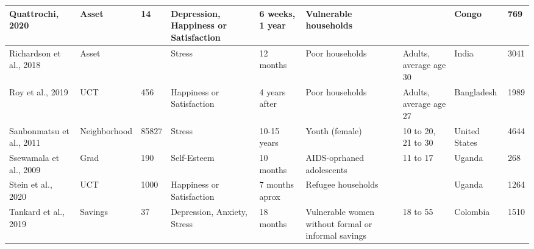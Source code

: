 \begin{table}[ht]
\begin{tabular}{p{1.8cm}p{1.7cm}p{1.3 cm}p{2cm}p{1.7cm}p{2.0cm}p{1cm}p{1.2cm}p{1cm}}
   \hline
Quattrochi, 2020 & Asset & 14 & Depression, Happiness or Satisfaction & 6 weeks, 1 year & Vulnerable households &  & Congo & 769 \\ 
   \hline
Richardson et al., 2018 & Asset &  & Stress & 12 months & Poor households & Adults, average age 30 & India & 3041 \\ 
   \hline
Roy et al., 2019 & UCT & 456 & Happiness or Satisfaction & 4 years after & Poor households & Adults, average age 27 & Bangladesh & 1989 \\ 
   \hline
Sanbonmatsu et al., 2011 & Neighborhood & 85827 & Stress & 10-15 years & Youth (female) & 10 to 20, 21 to 30 & United States & 4644 \\ 
   \hline
Ssewamala et al., 2009 & Grad & 190 & Self-Esteem & 10 months & AIDS-oprhaned adolescents & 11 to 17 & Uganda & 268 \\ 
   \hline
Stein et al., 2020 & UCT & 1000 & Happiness or Satisfaction & 7 months aprox & Refugee households &  & Uganda & 1264 \\ 
   \hline
Tankard et al., 2019 & Savings & 37 & Depression, Anxiety, Stress & 18 months & Vulnerable women without formal or informal savings & 18 to 55 & Colombia & 1510 \\ 
   \hline
\end{tabular}
\endgroup
\end{table}
